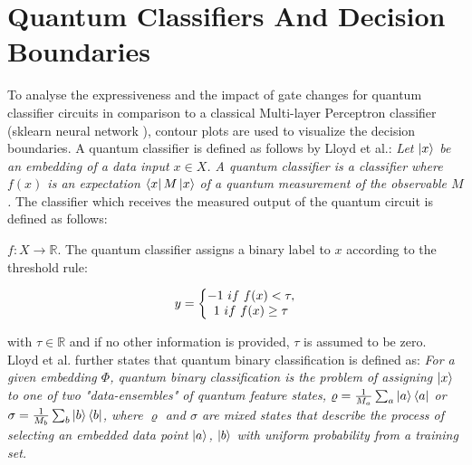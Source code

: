 
\chapter{Quantum Classifiers And Decision Boundaries} %

\label{chapter:quantum_classifiers_decision_boundaries}
To analyse the expressiveness and the impact of gate changes for quantum classifier circuits in comparison to a classical Multi-layer Perceptron classifier (sklearn neural network \href{https://scikit-learn.org/stable/modules/generated/sklearn.neural_network.MLPClassifier.html}{}), contour plots are used to visualize the decision boundaries. A quantum classifier is defined as follows by Lloyd et al.\cite{Quantum_embeddings_for_machine_learning_2020}: \textit{Let $\ket{x}$ be an embedding of a data input $x \in X$. A quantum classifier is a classifier where $f(x)$ is an expectation $\bra{x}M\ket{x}$ of a quantum measurement of the observable $M$.}
The classifier which receives the measured output of the quantum circuit is defined as follows\cite{Quantum_embeddings_for_machine_learning_2020}:
\hfill \break

$f : X \rightarrow\mathbb{R}$. The quantum classifier assigns a binary label to $x$ according to the threshold rule:

\begin{equation}
    \centering
    \begin{split}
    y =
        \left\{\begin{matrix}
            -1\ if\ f(x) < \tau ,\\
            1\ if\ f(x) \geq \tau
        \end{matrix}\right.
    \end{split}
    \label{equation:classifier_definition}
\end{equation}

with $\tau\in\mathbb{R}$ and if no other information is provided, $\tau$ is assumed to be zero.\\
\hfill \break
Lloyd et al.\cite{Quantum_embeddings_for_machine_learning_2020} further states that quantum binary classification is defined as: \textit{For a given embedding $\Phi$, quantum binary classification is the problem of assigning $\ket{x}$ to one
of two "data-ensembles" of quantum feature states, $\varrho = \frac{1}{M_a} \sum_{a} \ket{a} \bra{a} $ or $ \sigma = \frac{1}{M_b} \sum_{b} \ket{b} \bra{b} $, where $\varrho$ and $\sigma$ are mixed states that describe the process of selecting an embedded data point $\ket{a}$, $\ket{b}$ with uniform probability from a training set.}
\hfill \break

